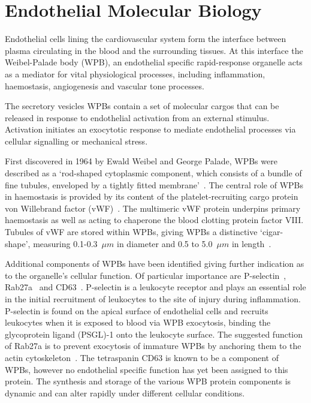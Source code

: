 \section{Endothelial Molecular Biology}
Endothelial cells lining the cardiovascular system form the interface between plasma circulating in the blood and the surrounding tissues. At this interface the Weibel-Palade body (WPB), an endothelial specific rapid-response organelle acts as a mediator for vital physiological processes, including inflammation, haemostasis, angiogenesis and vascular tone processes.

The secretory vesicles WPBs contain a set of molecular cargos that can be released in response to endothelial activation from an external stimulus. Activation initiates an exocytotic response to mediate endothelial processes via cellular signalling or mechanical stress.

First discovered in 1964 by Ewald Weibel and George Palade, WPBs were described as a `rod-shaped cytoplasmic component, which consists of a bundle of fine tubules, enveloped by a tightly fitted membrane'~\cite{Weibel1964}. The central role of WPBs in haemostasis is provided by its content of the platelet-recruiting cargo protein von Willebrand factor (vWF)~\cite{Wagner1982}. The multimeric vWF protein underpins primary haemostasis as well as acting to chaperone the blood clotting protein factor VIII. Tubules of vWF are stored within WPBs, giving WPBs a distinctive `cigar-shape', measuring 0.1-0.3~$\mu m$ in diameter and 0.5 to 5.0~$\mu m$ in length~\cite{Ferraro2014}.

Additional components of WPBs have been identified giving further indication as to the organelle's cellular function. Of particular importance are P-selectin~\cite{Bonfanti1989,McEver1989}, Rab27a~\cite{Hannah2003} and CD63~\cite{Vischer1993}. P-selectin is a leukocyte receptor and plays an essential role in the initial recruitment of leukocytes to the site of injury during inflammation. P-selectin is found on the apical surface of endothelial cells and recruits leukocytes when it is exposed to blood via WPB exocytosis, binding the glycoprotein ligand (PSGL)-1 onto the leukocyte surface. The suggested function of Rab27a is to prevent exocytosis of immature WPBs by anchoring them to the actin cytoskeleton~\cite{Nightingale2009}. The tetraspanin CD63 is known to be a component of WPBs, however no endothelial specific function has yet been assigned to this protein. The synthesis and storage of the various WPB protein components is dynamic and can alter rapidly under different cellular conditions.

